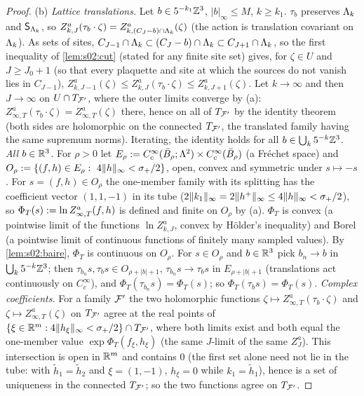 \begin{proof}
(b) \emph{Lattice translations.} Let $b\in5^{-k_1}\mathbb Z^3$, $|b|_\infty\le M$, $k\ge k_1$. $\tau_b$ preserves $\Lambda_k$ and $\mathsf S_{\Lambda_k}$, so $Z^a_{k,J}(\tau_b\cdot\zeta)=Z^a_{k,(C_J-b)\cap\Lambda_k}(\zeta)$ (the action is translation covariant on $\Lambda_k$). As sets of sites, $C_{J-1}\cap\Lambda_k\subset(C_J-b)\cap\Lambda_k\subset C_{J+1}\cap\Lambda_k$, so the first inequality of \cref{lem:s02:cut} (stated for any finite site set) gives, for $\zeta\in U$ and $J\ge J_0+1$ (so that every plaquette and site at which the sources do not vanish lies in $C_{J-1}$), $Z^a_{k,J-1}(\zeta)\le Z^a_{k,J}(\tau_b\cdot\zeta)\le Z^a_{k,J+1}(\zeta)$. Let $k\to\infty$ and then $J\to\infty$ on $U\cap T_{\mathcal F'}$, where the outer limits converge by (a): $Z^a_{\infty,T}(\tau_b\cdot\zeta)=Z^a_{\infty,T}(\zeta)$ there, hence on all of $T_{\mathcal F'}$ by the identity theorem (both sides are holomorphic on the connected $T_{\mathcal F'}$, the translated family having the same supremum norms). Iterating, the identity holds for all $b\in\bigcup_k5^{-k}\mathbb Z^3$.
\emph{All $b\in\mathbb R^3$.} For $\rho>0$ let $E_\rho:= C^\infty_c(\bar B_\rho;\Lambda^2)\times C^\infty_c(\bar B_\rho)$ (a Fr\'echet space) and $O_\rho\defeq\{(f,h)\in E_\rho:\ 4\norm h_\infty<\sigma_+/2\}$, open, convex and symmetric under $s\mapsto-s$. For $s=(f,h)\in O_\rho$ the one-member family with its splitting has the coefficient vector $(1,1,-1)$ in its tube ($2\lVert k_1\rVert_\infty=2\lVert h^+\rVert_\infty\le4\lVert h\rVert_\infty<\sigma_+/2$), so $\Phi_T(s):=\ln Z^a_{\infty,T}(f,h)$ is defined and finite on $O_\rho$ by (a). $\Phi_T$ is convex (a pointwise limit of the functions $\ln Z^a_{k,J}$, convex by H\"older's inequality) and Borel (a pointwise limit of continuous functions of finitely many sampled values). By \cref{lem:s02:baire}, $\Phi_T$ is continuous on $O_\rho$. For $s\in O_\rho$ and $b\in\mathbb R^3$ pick $b_n\to b$ in $\bigcup_k5^{-k}\mathbb Z^3$; then $\tau_{b_n}s,\tau_bs\in O_{\rho+|b|+1}$, $\tau_{b_n}s\to\tau_bs$ in $E_{\rho+|b|+1}$ (translations act continuously on $C^\infty_c$), and $\Phi_T(\tau_{b_n}s)=\Phi_T(s)$; so $\Phi_T(\tau_bs)=\Phi_T(s)$.
\emph{Complex coefficients.} For a family $\mathcal F'$ the two holomorphic functions $\zeta\mapsto Z^a_{\infty,T}(\tau_b\cdot\zeta)$ and $\zeta\mapsto Z^a_{\infty,T}(\zeta)$ on $T_{\mathcal F'}$ agree at the real points of $\{\xi\in\mathbb R^m:4\lVert h_\xi\rVert_\infty<\sigma_+/2\}\cap T_{\mathcal F'}$, where both limits exist and both equal the one-member value $\exp\Phi_T(f_\xi,h_\xi)$ (the same $J$-limit of the same $Z^a_J$). This intersection is open in $\mathbb R^m$ and contains $0$ (the first set alone need not lie in the tube: with $\tilde h_1=\tilde h_2$ and $\xi=(1,-1)$, $h_\xi=0$ while $k_1=\tilde h_1$), hence is a set of uniqueness in the connected $T_{\mathcal F'}$; so the two functions agree on $T_{\mathcal F'}$.
\end{proof}

